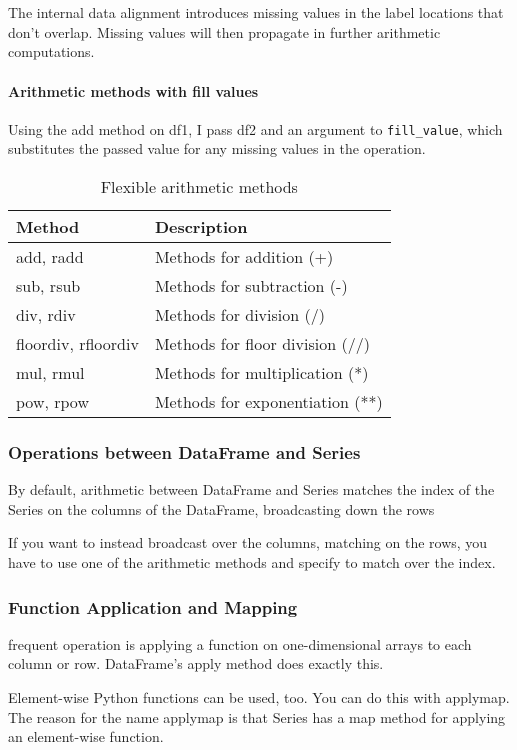 \chapter{\label{Ch05}}
\section{}
\subsection{}
The internal data alignment introduces missing values in the label locations that don’t overlap. Missing values will then propagate in further arithmetic computations.
\subsubsection*{Arithmetic methods with fill values}
Using the add method on df1, I pass df2 and an argument to \verb|fill_value|, which substitutes the passed value for any missing values in the operation.

\begin{table}
    \centering
    \caption{Flexible arithmetic methods}
    \begin{tabularx}{.6\textwidth}{ll}
        \hline
        Method              & Description                     \\
        \hline
        add, radd           & Methods for addition (+)        \\
        sub, rsub           & Methods for subtraction (-)     \\
        div, rdiv           & Methods for division (/)        \\
        floordiv, rfloordiv & Methods for floor division (//) \\
        mul, rmul           & Methods for multiplication (*)  \\
        pow, rpow           & Methods for exponentiation (**) \\
        \hline
    \end{tabularx}
\end{table}

\subsection*{Operations between DataFrame and Series}
By default, arithmetic between DataFrame and Series matches the index of the Series on the columns of the DataFrame, broadcasting down the rows

If you want to instead broadcast over the columns, matching on the rows, you have to use one of the arithmetic methods and specify to match over the index.
\subsection{Function Application and Mapping}
frequent operation is applying a function on one-dimensional arrays to each column or row. DataFrame’s apply method does exactly this.

Element-wise Python functions can be used, too. You can do this with applymap. The reason for the name applymap is that Series has a map method for applying an element-wise function.